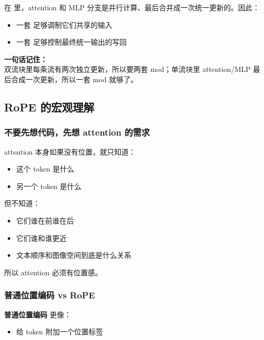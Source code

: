 在  里，attention 和 MLP 分支是并行计算、最后合并成一次统一更新的。因此：

\begin{itemize}[leftmargin=1.5em]
  \item 一套  足够调制它们共享的输入
  \item 一套  足够控制最终统一输出的写回
\end{itemize}

\begin{summarybox}
\textbf{一句话记住：}\\
双流块里每条流有两次独立更新，所以要两套 mod；单流块里 attention/MLP 最后合成一次更新，所以一套 mod 就够了。
\end{summarybox}

\subsection{RoPE 的宏观理解}

\subsubsection{不要先想代码，先想 attention 的需求}

attention 本身如果没有位置，就只知道：

\begin{itemize}[leftmargin=1.5em]
  \item 这个 token 是什么
  \item 另一个 token 是什么
\end{itemize}

但不知道：

\begin{itemize}[leftmargin=1.5em]
  \item 它们谁在前谁在后
  \item 它们谁和谁更近
  \item 文本顺序和图像空间到底是什么关系
\end{itemize}

所以 attention 必须有位置感。

\subsubsection{普通位置编码 vs RoPE}

\textbf{普通位置编码} 更像：
\begin{itemize}[leftmargin=1.5em]
  \item 给 token 附加一个位置标签
\end{itemize}

